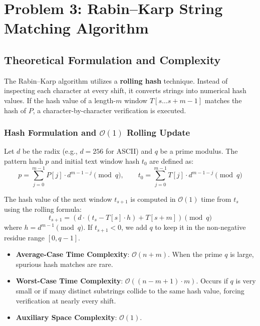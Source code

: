 \documentclass[12pt]{article}
\begin{document}
\section{Problem 3: Rabin--Karp String Matching Algorithm}

\subsection{Theoretical Formulation and Complexity}
The Rabin--Karp algorithm utilizes a \textbf{rolling hash} technique. Instead of inspecting each character at every shift, it converts strings into numerical hash values. If the hash value of a length-$m$ window $T[s \dots s+m-1]$ matches the hash of $P$, a character-by-character verification is executed.

\subsubsection{Hash Formulation and $\mathcal{O}(1)$ Rolling Update}
Let $d$ be the radix (e.g., $d = 256$ for ASCII) and $q$ be a prime modulus.
The pattern hash $p$ and initial text window hash $t_0$ are defined as:
\begin{equation}
p = \sum_{j=0}^{m-1} P[j] \cdot d^{m-1-j} \pmod q, \qquad t_0 = \sum_{j=0}^{m-1} T[j] \cdot d^{m-1-j} \pmod q
\end{equation}

The hash value of the next window $t_{s+1}$ is computed in $\mathcal{O}(1)$ time from $t_s$ using the rolling formula:
\begin{equation}
t_{s+1} = \left( d \cdot (t_s - T[s] \cdot h) + T[s+m] \right) \pmod q
\end{equation}
where $h = d^{m-1} \pmod q$. If $t_{s+1} < 0$, we add $q$ to keep it in the non-negative residue range $[0, q-1]$.

\begin{itemize}
    \item \textbf{Average-Case Time Complexity}: $\mathcal{O}(n + m)$. When the prime $q$ is large, spurious hash matches are rare.
    \item \textbf{Worst-Case Time Complexity}: $\mathcal{O}((n - m + 1) \cdot m)$. Occurs if $q$ is very small or if many distinct substrings collide to the same hash value, forcing verification at nearly every shift.
    \item \textbf{Auxiliary Space Complexity}: $\mathcal{O}(1)$.
\end{itemize}
\end{document}

